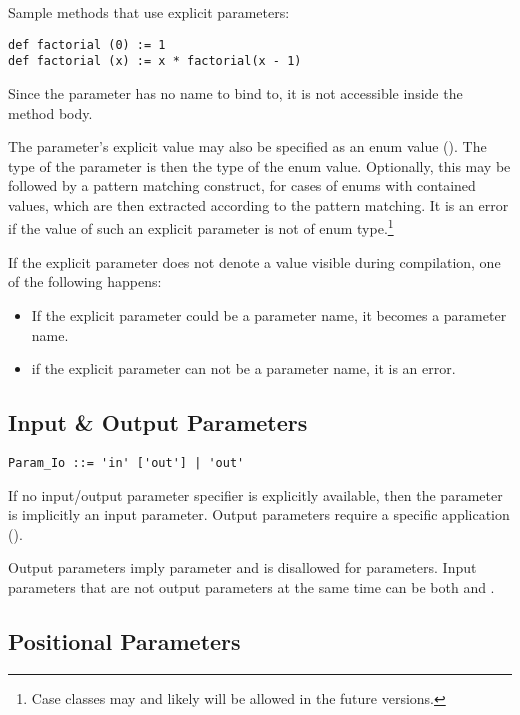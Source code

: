 \example Sample methods that use explicit parameters:
\begin{lstlisting}
def factorial (0) := 1
def factorial (x) := x * factorial(x - 1)
\end{lstlisting}

Since the parameter has no name to bind to, it is not accessible inside the method body. 

The parameter's explicit value may also be specified as an enum value (). The type of the parameter is then the type of the enum value. Optionally, this may be followed by a pattern matching construct, for cases of enums with contained values, which are then extracted according to the pattern matching. It is an error if the value of such an explicit parameter is not of enum type.\footnote{Case classes may and likely will be allowed in the future versions.} %

If the explicit parameter does not denote a value visible during compilation, one of the following happens:
\begin{itemize}
  \item If the explicit parameter could be a parameter name, it becomes a parameter name. 
  \item if the explicit parameter can not be a parameter name, it is an error. 
\end{itemize}






\subsection{Input \& Output Parameters}
\label{sec:io-parameters}

\syntax\begin{lstlisting}
Param_Io ::= 'in' ['out'] | 'out'
\end{lstlisting}

If no input/output parameter specifier is explicitly available, then the parameter is implicitly an input parameter. Output parameters require a specific application ().

Output parameters imply  parameter and is disallowed for  parameters. Input parameters that are not output parameters at the same time can be both  and . 






\subsection{Positional Parameters}
\label{sec:positional-parameters}

